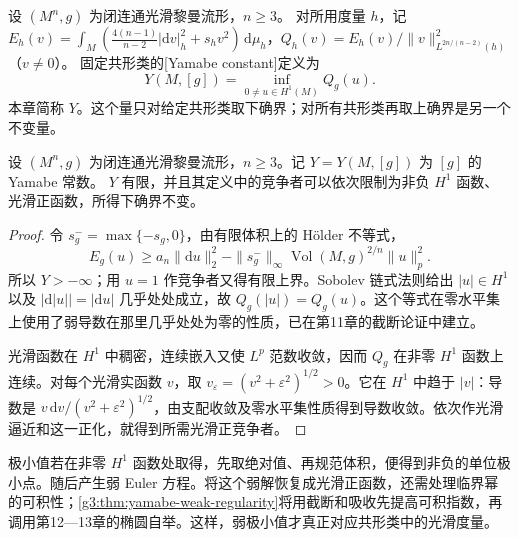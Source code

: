 \begin{definition}\label{g3:def:yamabe-constant}
	设 \((M^n,g)\) 为闭连通光滑黎曼流形，\(n\ge3\)。
	对所用度量 \(h\)，记 \(E_h(v)=\int_M(\tfrac{4(n-1)}{n-2}|\mathrm dv|_h^2+s_hv^2)\,\mathrm d\mu_h\)，\(Q_h(v)=E_h(v)/\|v\|_{L^{2n/(n-2)}(h)}^2\)（\(v\ne0\)）。
	固定共形类的[Yamabe constant]定义为
	\[
		Y(M,[g])=\inf_{0\ne u\in H^1(M)}Q_g(u).
	\]
	本章简称 \(Y\)。这个量只对给定共形类取下确界；对所有共形类再取上确界是另一个不变量。
\end{definition}

\begin{proposition}\label{g3:prop:yamabe-admissible-density}
	设 \((M^n,g)\) 为闭连通光滑黎曼流形，\(n\ge3\)。记 \(Y=Y(M,[g])\) 为 \([g]\) 的 Yamabe 常数。
	\(Y\) 有限，并且其定义中的竞争者可以依次限制为非负 \(H^1\) 函数、光滑正函数，所得下确界不变。
\end{proposition}
\begin{proof}
	令 \(s_g^- =\max\{-s_g,0\}\)，由有限体积上的 Hölder 不等式，
	\[
		E_g(u)\ge a_n\|\mathrm du\|_2^2-\|s_g^-\|_\infty
		\operatorname{Vol}(M,g)^{2/n}\|u\|_p^2.
	\]
	所以 \(Y> -\infty\)；用 \(u=1\) 作竞争者又得有限上界。Sobolev 链式法则给出 \(|u|\in H^1\) 以及 \(|\mathrm d|u||=|\mathrm du|\) 几乎处处成立，故 \(Q_g(|u|)=Q_g(u)\)。这个等式在零水平集上使用了弱导数在那里几乎处处为零的性质，已在第11章的截断论证中建立。

	光滑函数在 \(H^1\) 中稠密，连续嵌入又使 \(L^p\) 范数收敛，因而 \(Q_g\) 在非零 \(H^1\) 函数上连续。对每个光滑实函数 \(v\)，取 \(v_\varepsilon=(v^2+\varepsilon^2)^{1/2}>0\)。它在 \(H^1\) 中趋于 \(|v|\)：导数是 \(v\,\mathrm dv/(v^2+\varepsilon^2)^{1/2}\)，由支配收敛及零水平集性质得到导数收敛。依次作光滑逼近和这一正化，就得到所需光滑正竞争者。
\end{proof}

极小值若在非零 \(H^1\) 函数处取得，先取绝对值、再规范体积，便得到非负的单位极小点。随后产生弱 Euler 方程。将这个弱解恢复成光滑正函数，还需处理临界幂的可积性；\cref{g3:thm:yamabe-weak-regularity}将用截断和吸收先提高可积指数，再调用第12—13章的椭圆自举。这样，弱极小值才真正对应共形类中的光滑度量。

